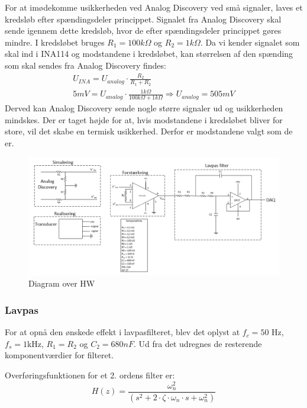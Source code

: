 \newline 
For at imødekomme usikkerheden ved Analog Discovery ved små signaler, laves et kredsløb efter spændingsdeler princippet. Signalet fra Analog Discovery skal sende igennem dette kredsløb, hvor de efter spændingsdeler princippet gøres mindre. I kredsløbet bruges $ R_1=100k\Omega $ og $ R_2 = 1k\Omega $. Da vi kender signalet som skal ind i INA114 og modstandene i kredsløbet, kan størrelsen af den spænding som skal sendes fra Analog Discovery findes:
\begin{equation}
\begin{split}
U_{INA} = U_{analog} \cdot \frac{R_2}{R_1 + R_2} \\
5mV = U_{analog}\cdot \frac{1k\Omega}{100k\Omega+1k\Omega} \Rightarrow U_{analog}= 505mV
\end{split}
\end{equation} 
Derved kan Analog Discovery sende nogle større signaler ud og usikkerheden mindskes. Der er taget højde for at, hvis modstandene i kredsløbet bliver for store, vil det skabe en termisk usikkerhed. Derfor er modstandene valgt som de er.  
\begin{figure}[H]
	\centering
	\includegraphics[width=1.0\textwidth]{Figurer/diagram_over_HW}
	\caption{Diagram over HW}
	\label{fig:HW}
\end{figure}

\subsubsection{Lavpas}
For at opnå den ønskede effekt i lavpasfilteret, blev det oplyst at $ f_c=50$ Hz, $ f_s = 1$kHz, $ R_1 = R_2 $ og $ C_2=680 nF$. Ud fra det udregnes de resterende komponentværdier for filteret.

Overføringsfunktionen for et 2. ordens filter er: 
\begin{equation}
H(z)=\frac{\omega_n^2}{(s^2 + 2\cdot\zeta \cdot \omega_n \cdot s+\omega_n^2)}
\end{equation}

